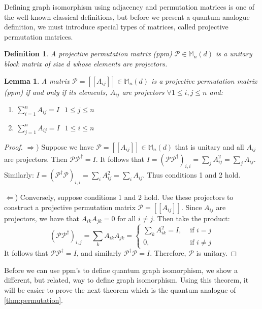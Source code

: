 \documentclass[12pt]{article}
\newtheorem{lem}[thm]{Lemma}
\newtheorem{defn}[thm]{Definition}
\begin{document}
Defining graph isomorphism using adjacency and permutation matrices is
one of the well-known classical definitions, but before we present a
quantum analogue definition, we must introduce special types of
matrices, called projective permutation matrices.

\begin{defn}
  A projective permutation matrix (ppm) $\mathcal{P} \in
  \mathbb{M}_n(d)$ is a unitary block matrix of size $d$ whose
  elements are projectors.
\end{defn}

\begin{lem}
  \label{ppm}
  A matrix $\mathcal{P} = [[A_{ij}]] \in \mathbb{M}_n(d)$ is a
  projective permutation matrix (ppm) if and only if its elements,
  $A_{ij}$ are projectors $\forall 1 \leq i, j \leq n$ and:
  \begin{enumerate}
  \item $\sum_{i=1}^n A_{ij} = I$ $ $ $1 \leq j \leq n$
  \item $\sum_{j=1}^n A_{ij} = I$ $ $ $1 \leq i \leq n$
  \end{enumerate}
\end{lem}

\begin{proof}
$\Rightarrow$) Suppose we have $\mathcal{P} = [[A_{ij}]] \in
  \mathbb{M}_n(d)$ that is unitary and all $A_{ij}$ are
  projectors. Then $\mathcal{P} \mathcal{P}^{\dag} = I$. It follows
  that $I = (\mathcal{P} \mathcal{P}^{\dag})_{i, i} = \sum_j A_{ij}^2
  = \sum_j A_{ij}$. Similarly: $I = (\mathcal{P}^{\dag}
  \mathcal{P})_{i, i} = \sum_i A_{ij}^2 = \sum_i A_{ij}$. Thus
  conditions 1 and 2 hold.

$\Leftarrow$) Conversely, suppose conditions 1 and 2 hold. Use these
  projectors to construct a projective permutation matrix $\mathcal{P}
  = [[A_{ij}]]$. Since $A_{ij}$ are projectors, we have that
  $A_{ik}A_{jk} = 0$ for all $i \neq j$. Then take the product:
\[ (\mathcal{P}\mathcal{P}^{\dag})_{i,j} = \sum_k A_{ik}A_{jk} = \begin{cases} 
\sum_k A_{ik}^2 = I, & \text{ if } i = j \\ 0, & \text{ if } i \neq
j \end{cases}
\]
It follows that $\mathcal{P}\mathcal{P}^{\dag} = I$, and similarly
$\mathcal{P}^{\dag} \mathcal{P} = I$. Therefore, $\mathcal{P}$ is
unitary.
\end{proof}

Before we can use ppm's to define quantum graph isomorphism, we show a
different, but related, way to define graph isomorphism. Using this
theorem, it will be easier to prove the next theorem which is the
quantum analogue of \cref{thm:permutation}.
\end{document}
